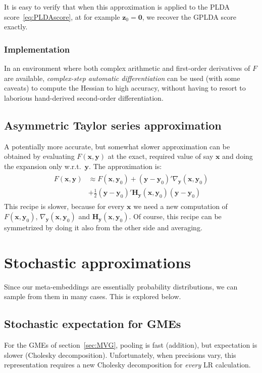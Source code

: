 \documentclass[a4paper,oneside,12pt,english]{report}
\def\zvec{\mathbf{z}}
\def\Hmat{\mathbf{H}}
\def\yvec{\mathbf{y}}
\def\xvec{\mathbf{x}}
\def\nulvec{\boldsymbol{0}}
\begin{document}
It is easy to verify that when this approximation is applied to the PLDA score~\eqref{eq:PLDAscore}, at for example $\zvec_0=\nulvec$, we recover the GPLDA score exactly. 

\subsubsection{Implementation}
In an environment where both complex arithmetic and first-order derivatives of $F$ are available, \emph{complex-step automatic differentiation} can be used (with some caveats) to compute the Hessian to high accuracy, without having to resort to laborious hand-derived second-order differentiation. 


\subsection{Asymmetric Taylor series approximation}
A potentially more accurate, but somewhat slower approximation can be obtained by evaluating $F(\xvec,\yvec)$ at the exact, required value of say $\xvec$ and doing the expansion only w.r.t.\ $\yvec$. The approximation is:  
\begin{align}
\begin{split}
F(\xvec,\yvec) &\approx F(\xvec,\yvec_0) + (\yvec-\yvec_0)'\nabla_\yvec(\xvec,\yvec_0)\\
&+ \frac12(\yvec-\yvec_0)'\Hmat_\yvec(\xvec,\yvec_0)(\yvec-\yvec_0)
\end{split}
\end{align} 
This recipe is slower, because for every $\xvec$ we need a new computation of $F(\xvec,\yvec_0)$, $\nabla_\yvec(\xvec,\yvec_0)$ and $\Hmat_\yvec(\xvec,\yvec_0)$. Of course, this recipe can be symmetrized by doing it also from the other side and averaging.


\section{Stochastic approximations}
Since our meta-embeddings are essentially probability distributions, we can sample from them in many cases. This is explored below.


\subsection{Stochastic expectation for GMEs}
\def\tvec{\mathbf{t}}
For the GMEs of section~\ref{sec:MVG}, pooling is fast (addition), but expectation is slower (Cholesky decomposition). Unfortunately, when precisions vary, this representation requires a new Cholesky decomposition for \emph{every} LR calculation. 
\end{document}
